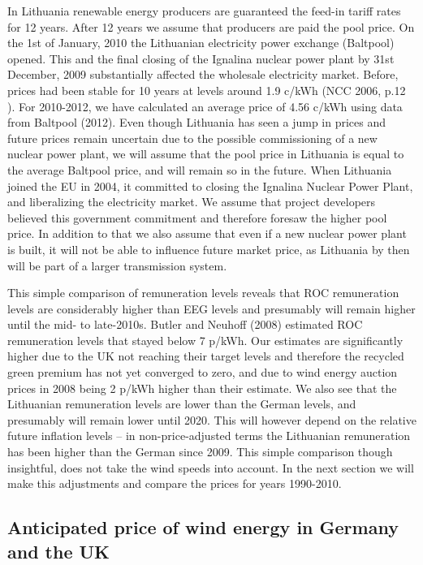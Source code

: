 \documentclass[a4paper, 12pt]{article}
\begin{document}
In Lithuania renewable energy producers are guaranteed the feed-in tariff rates for 12 years. After 12 years we assume that producers are paid the pool price. On the 1st of January, 2010 the Lithuanian electricity power exchange (Baltpool) opened. This and the final closing of the Ignalina nuclear power plant by 31st December, 2009 substantially affected the wholesale electricity market. Before, prices had been stable for 10 years at levels around 1.9 c/kWh (NCC 2006, p.12 ). For 2010-2012, we have calculated an average price of 4.56 c/kWh using data from Baltpool (2012). Even though Lithuania has seen a jump in prices and future prices remain uncertain due to the possible commissioning of a new nuclear power plant, we will assume that the pool price in Lithuania is equal to the average Baltpool price, and will remain so in the future. When Lithuania joined the EU in 2004, it committed to closing the Ignalina Nuclear Power Plant, and liberalizing the electricity market. We assume that project developers believed this government commitment and therefore foresaw the higher pool price. In addition to that we also assume that even if a new nuclear power plant is built, it will not be able to influence future market price, as Lithuania by then will be part of a larger transmission system.

This simple comparison of remuneration levels reveals that ROC remuneration levels are considerably higher than EEG levels and presumably will remain higher until the mid- to late-2010s. Butler and Neuhoff (2008) estimated ROC remuneration levels that stayed below 7 p/kWh. Our estimates are significantly higher due to the UK not reaching their target levels and therefore the recycled green premium has not yet converged to zero, and due to wind energy auction prices in 2008 being 2 p/kWh higher than their estimate. We also see that the Lithuanian remuneration levels are lower than the German levels, and presumably will remain lower until 2020. This will however depend on the relative future inflation levels – in non-price-adjusted terms the Lithuanian remuneration has been higher than the German since 2009. This simple comparison though insightful, does not take the wind speeds into account. In the next section we will make this adjustments and compare the prices for years 1990-2010.

\subsection{Anticipated price of wind energy in Germany and the UK}
\end{document}
